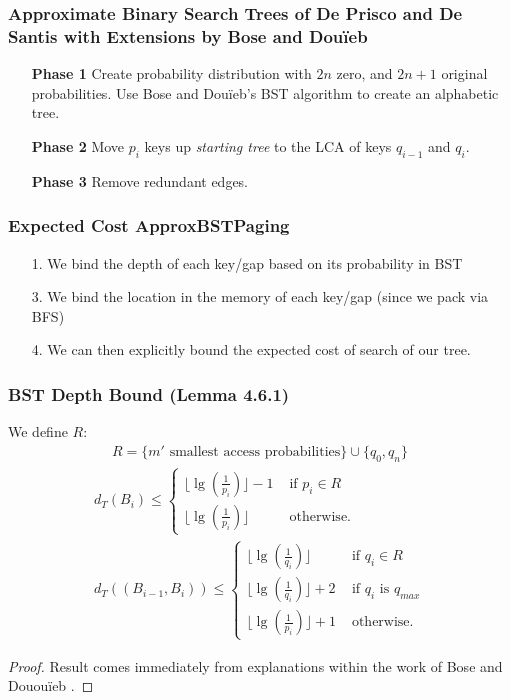 \documentclass[]{beamer}
\theoremstyle{plain}
\begin{document}
\begin{frame} \frametitle{Approximate Binary Search Trees of De Prisco and De Santis with Extensions by Bose and Dou\"{i}eb} \label{sec:deBST}

\begin{itemize}
\item[\textbf{Phase 1}] Create probability distribution with $2n$ zero, and $2n+1$ original probabilities. Use Bose and Dou\"{i}eb's BST algorithm to create an alphabetic tree.

\item[\textbf{Phase 2}] Move $p_i$ keys up \textit{starting tree} to the LCA of keys $q_{i-1}$ and $q_i$.

\item[\textbf{Phase 3}] Remove redundant edges.
\end{itemize}
\end{frame}


\begin{frame} \frametitle{Expected Cost ApproxBSTPaging}\label{48}
\begin{itemize}
\item[1.] We bind the depth of each key/gap based on its probability in BST
\item[3.] We bind the location in the memory of each key/gap (since we pack via BFS)
\item[4.] We can then explicitly bound the expected cost of search of our tree.
\end{itemize}
\end{frame}

\begin{frame}\frametitle{BST Depth Bound (Lemma 4.6.1)}
We define $R$:
\begin{align*}
R = \{m' \text{ smallest access probabilities}\} \cup \{q_0, q_n\}
\end{align*}
\begin{align*} 
d_T(B_i) \leq
\begin{cases}  
\lfloor \lg(\frac{1}{p_i}) \rfloor - 1 &\text{ if } p_i \in R  \\
\lfloor \lg(\frac{1}{p_i}) \rfloor &\text{ otherwise.}
\end{cases} \\
d_T((B_{i-1},B_i)) \leq 
\begin{cases}  
\lfloor \lg(\frac{1}{q_i}) \rfloor &\text{ if } q_i \in R  \\
\lfloor \lg(\frac{1}{q_i}) \rfloor + 2 &\text{ if } q_i \text{ is } q_{max} \\
\lfloor \lg(\frac{1}{p_i}) \rfloor + 1 &\text{ otherwise.}
\end{cases}
\end{align*}


\begin{proof}
Result comes immediately from explanations within the work of Bose and Douou\"{i}eb \cite{bose2009efficient}.
\end{proof}

\end{frame}
\end{document}
